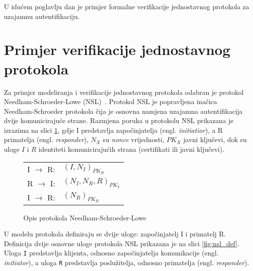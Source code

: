 U idućem poglavlju dan je primjer formalne verifikacije jednostavnog protokola
za uzajamnu autentifikaciju.

\section{Primjer verifikacije jednostavnog protokola}

Za primjer modeliranja i verifikacije jednostavnog protokola odabran je protokol
Needham-Schroeder-Lowe (NSL)~\cite{lowe1996breaking}. Protokol NSL je popravljena
inačica Needham-Schroeder protokola čija je osnovna namjena uzajamna
autentifikacija dvije komunicirajuće strane. Razmjena poruka u protokolu NSL
prikazana je izrazima na slici \ref{fig:nsl_spec}, gdje I predstavlja započinjatelja
(engl. \emph{initiatior}), a R primatelja (engl. \emph{responder}),
$N_X$ su \emph{nonce} vrijednosti, $PK_X$ javni ključevi, dok su uloge $I$ i $R$
identiteti komunicirajućih strana (certifikati ili javni ključevi).

\begin{figure}[htb]
    \begin{center}
\begin{tabular}{p{1.5cm} p{3.0cm}}
    I $\rightarrow$ R: & $(I, N_I)_{PK_R}$\\
    R $\rightarrow$ I: & $(N_I,N_R,R)_{PK_I}$\\
    I $\rightarrow$ R: & $(N_R)_{PK_R}$\\
\end{tabular}
    \end{center}
\vspace{-15pt}
\caption{Opis protokola Needham-Schroeder-Lowe}
\label{fig:nsl_spec}
\end{figure}

U modelu protokola definiraju se dvije uloge: započinjatelj I i primatelj R.
Definicija dvije osnovne uloge protokola NSL prikazana je na slici
\ref{fig:nsl_def}. Uloga \texttt{I} predstavlja klijenta, odnosno započinjatelja
komunikacije (engl. \emph{initiator}), a uloga \texttt{R} predstavlja
poslužitelja, odnosno primatelja (engl. \emph{responder}).


